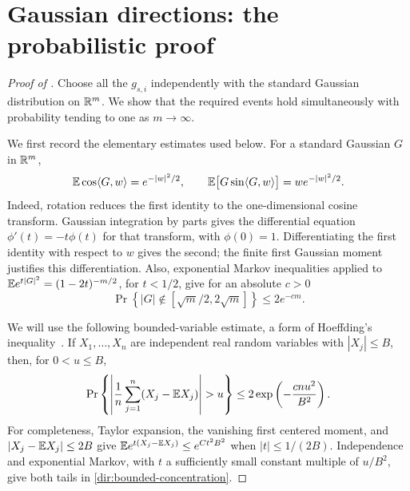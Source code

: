 \section{Gaussian directions: the probabilistic proof}
\label{app:directions}

\begin{proof}[Proof of ]
Choose all the $g_{s,i}$ independently with the standard Gaussian distribution
on $\mathbb R^m$.  We show that the required events hold simultaneously with
probability tending to one as $m\to\infty$.

We first record the elementary estimates used below.  For a standard Gaussian
$G$ in $\mathbb R^m$,
\begin{equation}\label{dir:gaussian-identities}
 \mathbb E\cos\langle G,w\rangle=e^{-|w|^2/2},
 \qquad
 \mathbb E\bigl[G\sin\langle G,w\rangle\bigr]=w e^{-|w|^2/2}.
\end{equation}
Indeed, rotation reduces the first identity to the one-dimensional cosine
transform.  Gaussian integration by parts gives the differential equation
$\phi'(t)=-t\phi(t)$ for that transform, with $\phi(0)=1$.  Differentiating
the first identity with respect to $w$ gives the second; the finite first
Gaussian moment justifies this differentiation.  Also, exponential Markov
inequalities applied to
$\mathbb E e^{t|G|^2}=(1-2t)^{-m/2}$, for $t<1/2$, give
for an absolute $c>0$
\begin{equation}\label{dir:gaussian-norm-tail}
 \Pr\left\{|G|\notin[\sqrt m/2,2\sqrt m]\right\}
 \le 2e^{-c m}.
\end{equation}

We will use the following bounded-variable estimate, a form of
Hoeffding's inequality~\cite{Hoe63}. If $X_1,\ldots,X_n$
are independent real random variables with $|X_j|\le B$, then, for
$0<u\le B$,
\begin{equation}\label{dir:bounded-concentration}
 \Pr\left\{\left|\frac1n\sum_{j=1}^n(X_j-\E X_j)\right|>u\right\}
 \le 2\exp\left(-\frac{c n u^2}{B^2}\right).
\end{equation}
For completeness, Taylor expansion, the vanishing first centered moment,
and $|X_j-\mathbb E X_j|\le2B$ give
$\mathbb E e^{t(X_j-\mathbb E X_j)}\le e^{C t^2B^2}$ when $|t|\le1/(2B)$.
Independence and exponential Markov, with $t$ a sufficiently small constant
multiple of $u/B^2$, give both tails in
\eqref{dir:bounded-concentration}.


\end{proof}
